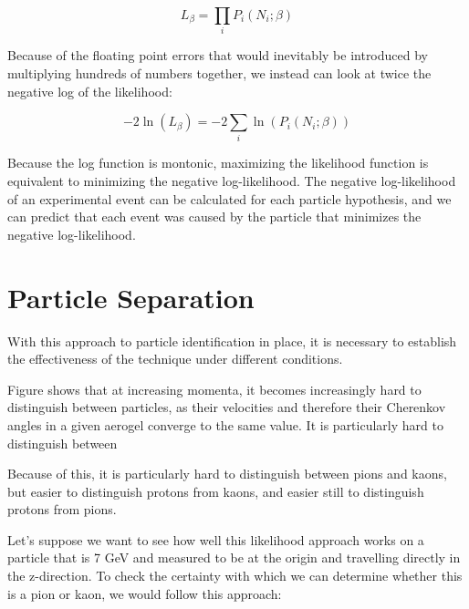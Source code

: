 $$L_\beta = \prod_{i}P_i(N_i; \beta)$$

Because of the floating point errors that would inevitably be introduced by multiplying hundreds of numbers together, we instead can look at twice the negative log of the likelihood:

\begin{equation}
    \label{eq:log-likelihood}
    -2\ln(L_\beta) = -2\sum_i \ln(P_i(N_i; \beta))
\end{equation}

Because the log function is montonic, maximizing the likelihood function is equivalent to minimizing the negative log-likelihood.
The negative log-likelihood of an experimental event can be calculated for each particle hypothesis, and we can predict that each event was caused by the particle that minimizes the negative log-likelihood.

\section{Particle Separation}
With this approach to particle identification in place, it is necessary to establish the effectiveness of the technique under different conditions.

Figure  shows that at increasing momenta, it becomes increasingly hard to distinguish between particles, as their velocities and therefore their Cherenkov angles in a given aerogel converge to the same value.
It is particularly hard to distinguish between 

Because of this, it is particularly hard to distinguish between pions and kaons, but easier to distinguish protons from kaons, and easier still to distinguish protons from pions.

Let's suppose we want to see how well this likelihood approach works on a particle that is 7 GeV and measured to be at the origin and travelling directly in the z-direction.
To check the certainty with which we can determine whether this is a pion or kaon, we would follow this approach:

